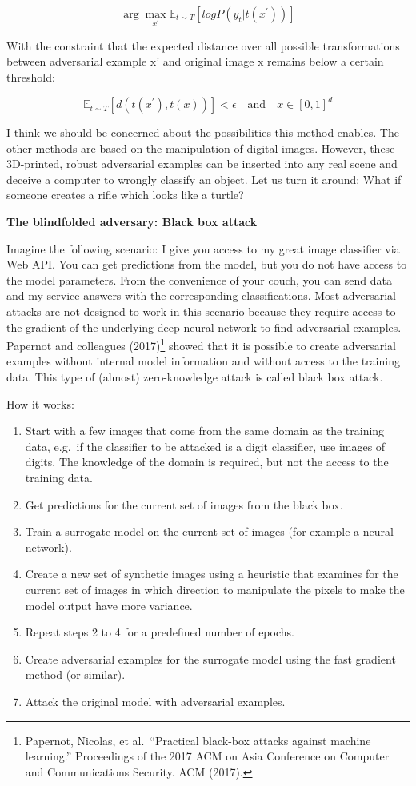 \documentclass[
  10pt,
]{scrbook}
\providecommand{\tightlist}{%
  \setlength{\itemsep}{0pt}\setlength{\parskip}{0pt}}
\begin{document}
\[\arg\max_{x^\prime}\mathbb{E}_{t\sim{}T}[log{}P(y_t|t(x^\prime))]\]

With the constraint that the expected distance over all possible transformations between adversarial example x' and original image x remains below a certain threshold:

\[\mathbb{E}_{t\sim{}T}[d(t(x^\prime),t(x))]<\epsilon\quad\text{and}\quad{}x\in[0,1]^d\]

I think we should be concerned about the possibilities this method enables.
The other methods are based on the manipulation of digital images.
However, these 3D-printed, robust adversarial examples can be inserted into any real scene and deceive a computer to wrongly classify an object.
Let us turn it around: What if someone creates a rifle which looks like a turtle?

\textbf{The blindfolded adversary: Black box attack}

Imagine the following scenario:
I give you access to my great image classifier via Web API.
You can get predictions from the model, but you do not have access to the model parameters.
From the convenience of your couch, you can send data and my service answers with the corresponding classifications.
Most adversarial attacks are not designed to work in this scenario because they require access to the gradient of the underlying deep neural network to find adversarial examples.
Papernot and colleagues (2017)\footnote{Papernot, Nicolas, et al.~``Practical black-box attacks against machine learning.'' Proceedings of the 2017 ACM on Asia Conference on Computer and Communications Security. ACM (2017).} showed that it is possible to create adversarial examples without internal model information and without access to the training data.
This type of (almost) zero-knowledge attack is called black box attack.

How it works:

\begin{enumerate}
\def\labelenumi{\arabic{enumi}.}
\tightlist
\item
  Start with a few images that come from the same domain as the training data, e.g.~if the classifier to be attacked is a digit classifier, use images of digits. The knowledge of the domain is required, but not the access to the training data.
\item
  Get predictions for the current set of images from the black box.
\item
  Train a surrogate model on the current set of images (for example a neural network).
\item
  Create a new set of synthetic images using a heuristic that examines for the current set of images in which direction to manipulate the pixels to make the model output have more variance.
\item
  Repeat steps 2 to 4 for a predefined number of epochs.
\item
  Create adversarial examples for the surrogate model using the fast gradient method (or similar).
\item
  Attack the original model with adversarial examples.
\end{enumerate}
\end{document}
